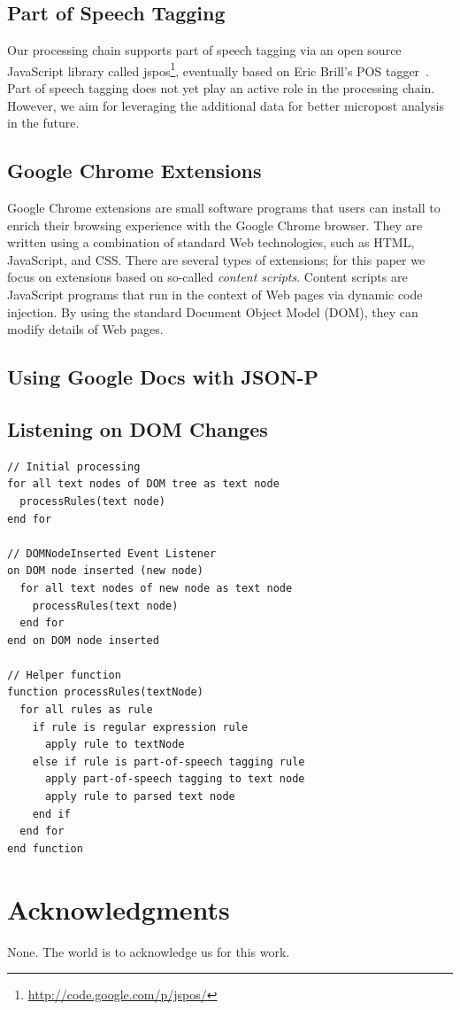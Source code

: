 \documentclass{acm_proc_article-sp}
\let\oldemph\emph
\renewcommand{\emph}[1]{\oldemph{\fontsize{9}{9}\selectfont #1}}
\newcommand{\inlinelistingsize}{\fontsize{8pt}{11pt}}
\let\oldttdefault\ttdefault
\renewcommand{\ttdefault}{pcr}
\let\oldurl\url
\renewcommand{\url}[1]{\inlinelistingsize\oldurl{#1}}
\begin{document}
\subsection{Part of Speech Tagging}
Our processing chain supports part of speech tagging via an open source JavaScript library called jspos\footnote{\url{http://code.google.com/p/jspos/}},
eventually based on Eric Brill's POS tagger~\cite{brill1992simple}. Part of speech tagging does not yet play an active role in the processing chain. However,
we aim for leveraging the additional data for better micropost analysis in the future.

\subsection{Google Chrome Extensions}
Google Chrome extensions are small software programs that users can install to enrich their browsing experience with the Google Chrome browser.
They are written using a combination of standard Web technologies, such as HTML, JavaScript, and CSS.
There are several types of extensions; for this paper we focus on extensions based on so-called \emph{content scripts}.
Content scripts are JavaScript programs that run in the context of Web pages via dynamic code injection.
By using the standard Document Object Model (DOM), they can modify details of Web pages.

\subsection{Using Google Docs with JSON-P}

\subsection{Listening on DOM Changes}
\cite{w3cevents2011}

\begin{lstlisting}[caption=Pseudocode illustrating the browser extension's functionality., label=code:xkcd, float=h, escapechar=§, belowskip=-1em]
// Initial processing
for all text nodes of DOM tree as text node
  processRules(text node)
end for  

// DOMNodeInserted Event Listener
on DOM node inserted (new node)
  for all text nodes of new node as text node
    processRules(text node)
  end for  
end on DOM node inserted

// Helper function
function processRules(textNode)
  for all rules as rule
    if rule is regular expression rule
      apply rule to textNode
    else if rule is part-of-speech tagging rule
      apply part-of-speech tagging to text node
      apply rule to parsed text node
    end if
  end for
end function  
\end{lstlisting} 

\section{Acknowledgments}
None. The world is to acknowledge us for this work.

\let\ttdefault\oldttdefault
\let\url\oldurl




\balancecolumns
\end{document}
